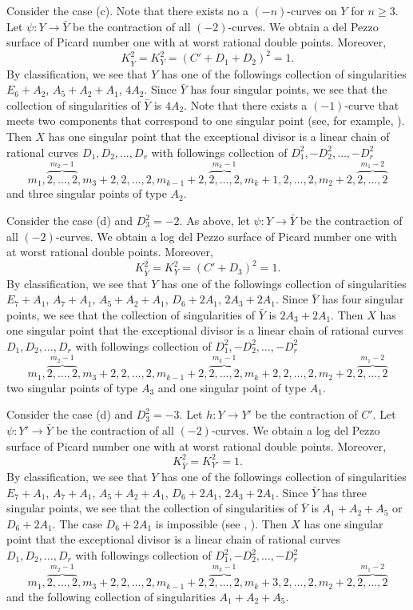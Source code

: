 \documentclass[10pt,oneside,reqno]{amsart}
\theoremstyle{definition}
\theoremstyle{remark}
\numberwithin{equation}{section}
\begin{document}
Consider the case (c). Note that there exists no a $(-n)$-curves on $Y$ for $n\geq 3$. Let $\psi\colon Y\rightarrow\bar{Y}$ be the contraction of all $(-2)$-curves. We obtain a del Pezzo surface of Picard number one with at worst rational double points. Moreover, $$K_{\bar{Y}}^2=K_Y^2=(C'+D_1+D_2)^2=1.$$ By classification, we see that $Y$ has one of the followings collection of singularities $E_6+A_2$, $A_5+A_2+A_1$, $4A_2$. Since $\bar{Y}$ has four singular points, we see that the collection of singularities of $\bar{Y}$ is $4A_2$. Note that there exists a $(-1)$-curve that meets two components that correspond to one singular point (see, for example, {\cite{AN}}). Then $X$ has one singular point that the exceptional divisor is a linear chain of rational curves $D_1,D_2,\ldots, D_r$ with followings collection of $D_1^2,-D_2^2,\ldots,-D_r^2$
$$m_1,\overbrace{2,\ldots,2}^{m_2-1},m_3+2,2,\ldots,2,m_{k-1}+2,\overbrace{2,\ldots,2}^{m_k-1},m_k+1,2,\ldots,2,m_2+2,\overbrace{2,\ldots,2}^{m_1-2}$$ and three singular points of type $A_2$.

Consider the case (d) and $D_3^2=-2$. As above, let $\psi\colon Y\rightarrow\bar{Y}$ be the contraction of all $(-2)$-curves. We obtain a log del Pezzo surface of Picard number one with at worst rational double points. Moreover, $$K_{\bar{Y}}^2=K_Y^2=(C'+D_3)^2=1.$$ By classification, we see that $Y$ has one of the followings collection of singularities $E_7+A_1$, $A_7+A_1$, $A_5+A_2+A_1$, $D_6+2A_1$, $2A_3+2A_1$. Since $\bar{Y}$ has four singular points, we see that the collection of singularities of $\bar{Y}$ is $2A_3+2A_1$. Then $X$ has one singular point that the exceptional divisor is a linear chain of rational curves $D_1,D_2,\ldots, D_r$ with followings collection of $D_1^2,-D_2^2,\ldots,-D_r^2$
$$m_1,\overbrace{2,\ldots,2}^{m_2-1},m_3+2,2,\ldots,2,m_{k-1}+2,\overbrace{2,\ldots,2}^{m_k-1},m_k+2,2,\ldots,2,m_2+2,\overbrace{2,\ldots,2}^{m_1-2}$$ two singular points of type $A_3$ and one singular point of type $A_1$.

Consider the case (d) and $D_3^2=-3$. Let $h\colon Y\rightarrow Y'$ be the contraction of $C'$. Let $\psi\colon Y'\rightarrow\bar{Y}$ be the contraction of all $(-2)$-curves. We obtain a log del Pezzo surface of Picard number one with at worst rational double points. Moreover, $$K_{\bar{Y}}^2=K_{Y'}^2=1.$$ By classification, we see that $Y$ has one of the followings collection of singularities $E_7+A_1$, $A_7+A_1$, $A_5+A_2+A_1$, $D_6+2A_1$, $2A_3+2A_1$. Since $\bar{Y}$ has three singular points, we see that the collection of singularities of $\bar{Y}$ is $A_1+A_2+A_5$ or $D_6+2A_1$. The case $D_6+2A_1$ is impossible (see {\cite{Ma}, \cite{Ye} \cite{Zan}}).  Then $X$ has one singular point that the exceptional divisor is a linear chain of rational curves $D_1,D_2,\ldots, D_r$ with followings collection of $D_1^2,-D_2^2,\ldots,-D_r^2$
$$m_1,\overbrace{2,\ldots,2}^{m_2-1},m_3+2,2,\ldots,2,m_{k-1}+2,\overbrace{2,\ldots,2}^{m_k-1},m_k+3,2,\ldots,2,m_2+2,\overbrace{2,\ldots,2}^{m_1-2}$$ and the following collection of singularities $A_1+A_2+A_5$.
\end{document}
